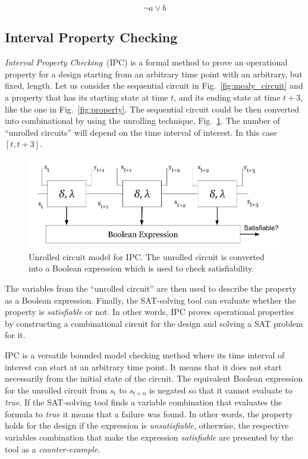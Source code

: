 \begin{equation}
    \neg a \lor  b
    \label{eq:not_a_or_a_and_b}
\end{equation}

\subsection{Interval Property Checking}
\label{subsection:ipc}

\textit{Interval Property Checking}~(IPC) is a formal method to prove an operational property for a design starting from an arbitrary time point with an arbitrary, but fixed, length. Let us consider the sequential circuit in Fig.~\ref{fig:mealy_circuit} and a property that has its starting state at time $t$, and its ending state at time $t+3$, like the one in Fig.~\ref{fig:property}. The sequential circuit could be then converted into combinational by using the unrolling technique, Fig.~\ref{fig:unrolled}. The number of “unrolled circuits” will depend on the time interval of interest. In this case $[t, t+3]$.

\begin{figure}[htb!]
	\centering
	\includegraphics[width=\textwidth]{images/unrolled_circuit.png}
	\caption{Unrolled circuit model for IPC. The unrolled circuit is converted into a Boolean expression which is used to check satisfiability.}
	\label{fig:unrolled}
\end{figure}

The variables from the “unrolled circuit” are then used to describe the property as a Boolean expression. Finally, the SAT-solving tool can evaluate whether the property is \textit{satisfiable} or not. In other words, IPC proves operational properties by constructing a combinational circuit for the design and solving a SAT problem for it. 

IPC is a versatile bounded model checking method where its time interval of interest can start at an arbitrary time point. It means that it does not start necessarily from the initial state of the circuit. The equivalent Boolean expression for the unrolled circuit from $s_t$ to $s_{t+n}$ is negated so that it cannot evaluate to \textit{true}. If the SAT-solving tool finds a variable combination that evaluates the formula to \textit{true} it means that a failure was found. In other words, the property holds for the design if the expression is \textit{unsatisfiable}, otherwise, the respective variables combination that make the expression \textit{satisfiable} are presented by the tool as a \textit{counter-example}.

